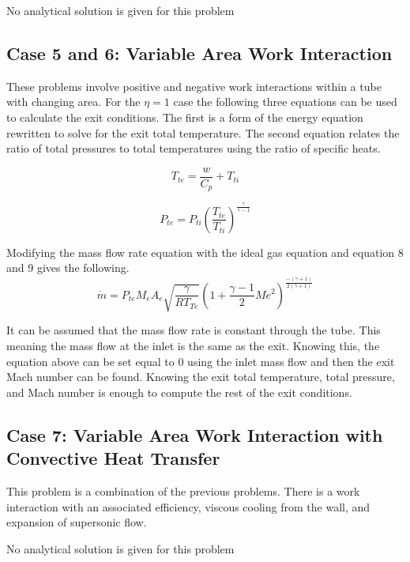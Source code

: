 \documentclass[conf]{new-aiaa}
\begin{document}
\noindent No analytical solution is given for this problem



\subsection*{Case 5 and 6: Variable Area Work Interaction}

These problems involve positive and negative work interactions within a tube with changing area.
For the $\eta = 1$ case the following three equations can be used to calculate the exit conditions.
The first is a form of the energy equation rewritten to solve for the exit total temperature. The second equation relates the ratio of total pressures to total temperatures using the ratio of specific heats.


\begin{equation}
    T_{te} = \frac{w}{C_p} + T_{ti}
\end{equation}

\begin{equation}
    P_{te} = P_{ti}\left(\frac{T_{te}}{T_{ti}}\right)^{\frac{\gamma}{\gamma-1} }
\end{equation}


\noindent Modifying the mass flow rate equation with the ideal gas equation and equation 8 and 9 gives the following.
\begin{equation}
    \dot{m} = {P_{te} M_e A_e} \sqrt{\frac{\gamma}{R T_{Te}}} \left(1+\frac{\gamma-1}{2} Me^2\right)^{\frac{-(\gamma+1)}{2(\gamma+1)}}
\end{equation}

It can be assumed that the mass flow rate is constant through the tube. This meaning the mass flow at the inlet is the same as the exit.
Knowing this, the equation above can be set equal to 0 using the inlet mass flow and then the exit Mach number can be found.
Knowing the exit total temperature, total pressure, and Mach number is enough to compute the rest of the exit conditions.

\subsection*{Case 7: Variable Area Work Interaction with Convective Heat Transfer}

This problem is a combination of the previous problems. There is a work interaction with an associated efficiency, viscous cooling from the wall, and expansion of supersonic flow.

\noindent No analytical solution is given for this problem
\end{document}
